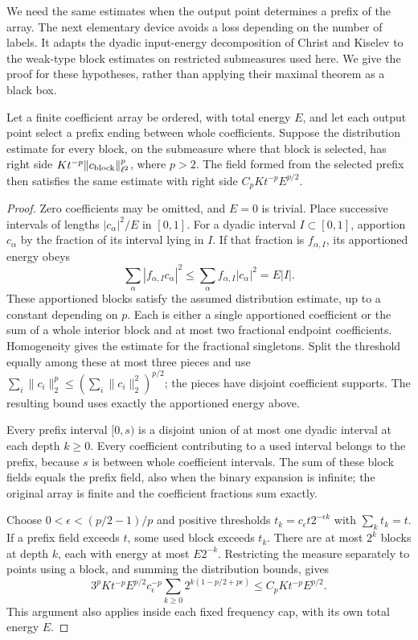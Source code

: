 We need the same estimates when the output point determines a prefix of
the array.  The next elementary device avoids a loss depending on the
number of labels. It adapts the dyadic input-energy decomposition of
Christ and Kiselev \cite[Theorem~1.1 and its proof in Section~2]{CK01}
to the weak-type block estimates on restricted submeasures used here.
We give the proof for these hypotheses, rather than applying their
maximal theorem as a black box.

\begin{lemma}\label{lem:dyadic-prefix}
Let a finite coefficient array be ordered, with total energy $E$, and let
each output point select a prefix ending between whole coefficients.
Suppose the distribution estimate for every block, on the submeasure
where that block is selected, has right side
$K t^{-p}\|c_{\rm block}\|_{\ell^2}^p$, where $p>2$.
The field formed from the selected prefix then satisfies the same
estimate with right side $C_p Kt^{-p}E^{p/2}$.
\end{lemma}
\begin{proof}
Zero coefficients may be omitted, and $E=0$ is trivial.  Place successive
intervals of lengths $|c_\alpha|^2/E$ in $[0,1]$.  For a dyadic interval
$I\subset[0,1]$, apportion $c_\alpha$ by the fraction of its interval
lying in $I$.  If that fraction is $f_{\alpha,I}$, its apportioned
energy obeys
\[
 \sum_\alpha |f_{\alpha,I}c_\alpha|^2
 \leq\sum_\alpha f_{\alpha,I}|c_\alpha|^2=E|I|.
\]
These apportioned blocks satisfy the assumed distribution estimate, up
to a constant depending on $p$. Each is either a single apportioned
coefficient or the sum of a whole interior block and at most two
fractional endpoint coefficients. Homogeneity gives the estimate for
the fractional singletons. Split the threshold equally among these at
most three pieces and use
$\sum_i\|c_i\|_2^p\leq(\sum_i\|c_i\|_2^2)^{p/2}$;
the pieces have disjoint coefficient supports. The resulting bound uses
exactly the apportioned energy above.

Every prefix interval $[0,s)$ is a disjoint union of at most one dyadic
interval at each depth $k\geq0$.  Every coefficient contributing to a
used interval belongs to the prefix, because $s$ is between whole
coefficient intervals.  The sum of these block fields equals the prefix
field, also when the binary expansion is infinite; the original array
is finite and the coefficient fractions sum exactly.

Choose $0<\epsilon<(p/2-1)/p$ and positive thresholds
$t_k=c_\epsilon t2^{-\epsilon k}$ with $\sum_k t_k=t$.
If a prefix field exceeds $t$, some used block exceeds $t_k$.
There are at most $2^k$ blocks at depth $k$, each with energy at most
$E2^{-k}$.  Restricting the measure separately to points using a block,
and summing the distribution bounds, gives
\[
 3^pKt^{-p}E^{p/2}c_\epsilon^{-p}
 \sum_{k\geq0}2^{k(1-p/2+p\epsilon)}
 \leq C_pKt^{-p}E^{p/2}.
\]
This argument also applies inside each fixed frequency cap, with its
own total energy $E$.
\end{proof}

